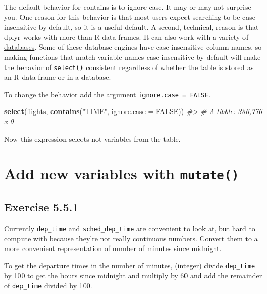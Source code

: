 \documentclass[]{book}
\newenvironment{Shaded}{\begin{snugshade}}{\end{snugshade}}
\newcommand{\CommentTok}[1]{\textcolor[rgb]{0.56,0.35,0.01}{\textit{#1}}}
\newcommand{\DataTypeTok}[1]{\textcolor[rgb]{0.13,0.29,0.53}{#1}}
\newcommand{\KeywordTok}[1]{\textcolor[rgb]{0.13,0.29,0.53}{\textbf{#1}}}
\newcommand{\NormalTok}[1]{#1}
\newcommand{\OtherTok}[1]{\textcolor[rgb]{0.56,0.35,0.01}{#1}}
\newcommand{\StringTok}[1]{\textcolor[rgb]{0.31,0.60,0.02}{#1}}
\theoremstyle{plain}
\theoremstyle{remark}
\begin{document}
The default behavior for contains is to ignore case. It may or may not
surprise you. One reason for this behavior is that most users expect
searching to be case insensitive by default, so it is a useful default.
A second, technical, reason is that dplyr works with more than R data
frames. It can also work with a variety of
\href{https://db.rstudio.com/dplyr/}{databases}. Some of these database
engines have case insensitive column names, so making functions that
match variable names case insensitive by default will make the behavior
of \texttt{select()} consistent regardless of whether the table is
stored as an R data frame or in a database.

To change the behavior add the argument \texttt{ignore.case\ =\ FALSE}.

\begin{Shaded}
\begin{Highlighting}[]
\KeywordTok{select}\NormalTok{(flights, }\KeywordTok{contains}\NormalTok{(}\StringTok{"TIME"}\NormalTok{, }\DataTypeTok{ignore.case =} \OtherTok{FALSE}\NormalTok{))}
\CommentTok{#> # A tibble: 336,776 x 0}
\end{Highlighting}
\end{Shaded}

Now this expression selects not variables from the table.

\hypertarget{add-new-variables-with-mutate}{%
\section{\texorpdfstring{Add new variables with
\texttt{mutate()}}{Add new variables with mutate()}}\label{add-new-variables-with-mutate}}

\hypertarget{exercise-5.5.1}{%
\subsection*{\texorpdfstring{Exercise
{5.5.1}}{Exercise 5.5.1}}\label{exercise-5.5.1}}

Currently \texttt{dep\_time} and \texttt{sched\_dep\_time} are
convenient to look at, but hard to compute with because they're not
really continuous numbers. Convert them to a more convenient
representation of number of minutes since midnight.

To get the departure times in the number of minutes, (integer) divide
\texttt{dep\_time} by 100 to get the hours since midnight and multiply
by 60 and add the remainder of \texttt{dep\_time} divided by 100.
\end{document}
